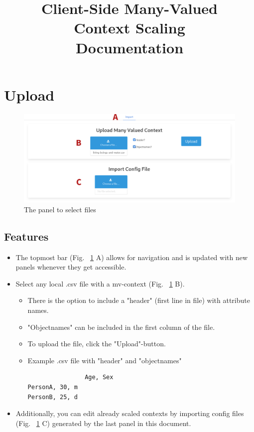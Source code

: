 \documentclass[]{article}
\title{Client-Side Many-Valued \protect\\ Context Scaling \protect\\ Documentation}
\begin{document}
\maketitle

\newpage
\tableofcontents

\newpage
\section{Upload}
\begin{figure}[H]
	\includegraphics[width=\linewidth]{images/upload.png}
	\caption{The panel to select files}
	\label{fig:p1}
\end{figure}
\subsection{Features}
\begin{itemize}
    \item The topmost bar (Fig. ~\ref{fig:p1} A) allows for navigation and is updated with new panels whenever they get accessible.
	\item Select any local .csv file with a mv-context (Fig. ~\ref{fig:p1} B).
    \begin{itemize}
        \item There is the option to include a "header" (first line in file) with attribute names.
        \item "Objectnames" can be included in the first column of the file.
        \item To upload the file, click the "Upload"-button.
		\item Example .csv file with "header" and "objectnames"
		\begin{lstlisting}
				Age, Sex
PersonA, 30, m
PersonB, 25, d\end{lstlisting}
    \end{itemize}
    \item Additionally, you can edit already scaled contexts by importing config files (Fig. ~\ref{fig:p1} C) generated by the last panel in this document.
\end{itemize}
\end{document}
